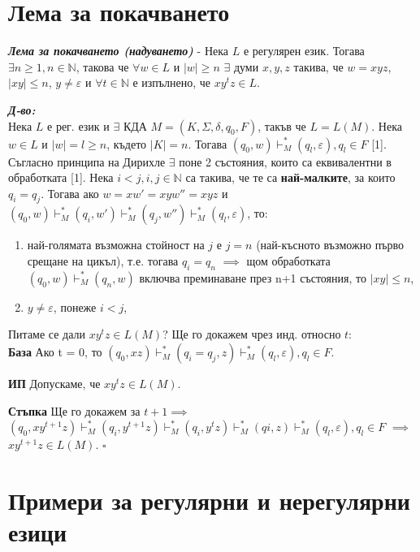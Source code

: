 \documentclass[fleqn,12pt]{article}
\begin{document}
\begin{flushleft}
\section{Лема за покачването}

\textit{\textbf{Лема за покачването (надуването)}} - Нека $L$ е регулярен език. Тогава $\exists n \geq 1, n \in \mathbb{N}$, такова че $\forall w \in L$ и $|w| \geq n$ $\exists$ думи $x, y, z$ такива, че $w = xyz$, $|xy| \leq n$, $y \neq \varepsilon$ и $\forall t \in \mathbb{N}$ е изпълнено, че $xy^tz \in L$.

\textit{\textbf{Д-во:}}\\
Нека $L$ е рег. език и $\exists$ КДА $M = (K, \Sigma, \delta, q_0, F)$, такъв че $L = L(M)$. Нека $w \in L$ и $|w| = l \geq n$, където $|K| = n$. Тогава $(q_0, w) \vdash_M^* (q_l, \varepsilon), q_l \in F$ [1]. \\
Съгласно принципа на Дирихле $\exists$ поне 2 състояния, които са еквивалентни в обработката [1]. Нека $i < j, i,j \in \mathbb{N}$ са такива, че те са \textbf{най-малките}, за които $q_i = q_j$. Тогава ако $w = xw' = xyw'' = xyz$ и $(q_0, w) \vdash_M^* (q_i, w') \vdash_M^* (q_j, w'') \vdash_M^* (q_l, \varepsilon)$, то:
\begin{enumerate}
    \item най-голямата възможна стойност на $j$ е $j=n$ (най-късното възможно първо срещане на цикъл), т.е. тогава $q_i = q_n$ $\implies$ щом обработката $(q_0, w) \vdash_M^* (q_n, w)$ включва преминаване през n+1 състояния, то $|xy| \leq n$,
    \item $y \neq \varepsilon$, понеже $i < j$,
\end{enumerate}

Питаме се дали $xy^tz \in L(M)$? Ще го докажем чрез инд. относно $t$: \\

\textbf{База} Ако t = 0, то $(q_0, xz) \vdash_M^* (q_i = q_j, z) \vdash_M^* (q_l, \varepsilon), q_l \in F$.

\textbf{ИП} Допускаме, че $xy^tz \in L(M)$.

\textbf{Стъпка} Ще го докажем за $t+1 \implies$ \\

$(q_0, xy^{t+1}z) \vdash_M^* (q_i, y^{t+1}z) \vdash_M^* (q_i, y^tz) \vdash_M^* (qi, z) \vdash_M^* (q_l, \varepsilon), q_l \in F$ $\implies$ $xy^{t+1}z \in L(M)$. $\square$

\section{Примери за регулярни и нерегулярни езици}


\end{flushleft}
\end{document}
